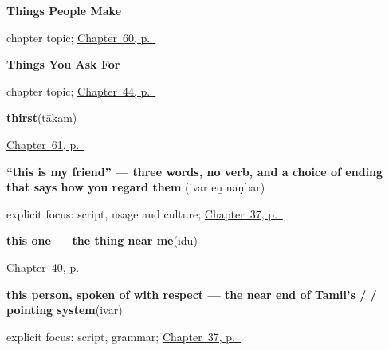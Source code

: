 \noindent\begin{minipage}[t]{\linewidth}
\raggedright
\textbf{Things People Make}\par
\footnotesize chapter topic; \hyperref[ch:ta-things-people-make]{Chapter~60, p.~\pageref*{ch:ta-things-people-make}}
\end{minipage}\par\smallskip

\noindent\begin{minipage}[t]{\linewidth}
\raggedright
\textbf{Things You Ask For}\par
\footnotesize chapter topic; \hyperref[ch:ta-things-you-ask-for]{Chapter~44, p.~\pageref*{ch:ta-things-you-ask-for}}
\end{minipage}\par\smallskip

\noindent\begin{minipage}[t]{\linewidth}
\raggedright
\textbf{thirst}\enspace\emph{}\enspace(tākam)\par
\footnotesize \hyperref[ch:ta-how-the-body-feels]{Chapter~61, p.~\pageref*{ch:ta-how-the-body-feels}}
\end{minipage}\par\smallskip

\noindent\begin{minipage}[t]{\linewidth}
\raggedright
\textbf{\textquotedblleft{}this is my friend\textquotedblright{} — three words, no verb, and a choice of ending that says how you regard them}\enspace\emph{  }\enspace(ivar eṉ naṇbar)\par
\footnotesize explicit focus: script, usage and culture; \hyperref[ch:ta-your-town-your-friend]{Chapter~37, p.~\pageref*{ch:ta-your-town-your-friend}}
\end{minipage}\par\smallskip

\noindent\begin{minipage}[t]{\linewidth}
\raggedright
\textbf{this one — the thing near me}\enspace\emph{}\enspace(idu)\par
\footnotesize \hyperref[ch:ta-pointing-and-asking]{Chapter~40, p.~\pageref*{ch:ta-pointing-and-asking}}
\end{minipage}\par\smallskip

\noindent\begin{minipage}[t]{\linewidth}
\raggedright
\textbf{this person, spoken of with respect — the near end of Tamil's  /  /  pointing system}\enspace\emph{}\enspace(ivar)\par
\footnotesize explicit focus: script, grammar; \hyperref[ch:ta-your-town-your-friend]{Chapter~37, p.~\pageref*{ch:ta-your-town-your-friend}}
\end{minipage}\par\smallskip


